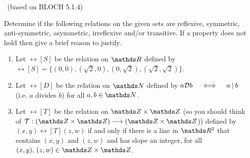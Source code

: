 \documentclass[11pt]{article}
\newcounter{Quesnumb}  %
\newcommand{\problemnum}{%
            \addtocounter{Quesnumb}{1}%
            \arabic{Quesnumb}}
\begin{document}
\begin{problem}{\problemnum \, \textsf{(based on BLOCH 5.1.4)}}
Determine if the following relations on the given sets are reflexive, symmetric, anti-symmetric, asymmetric, irreflexive and/or transitive. If a property does not hold then give a brief reason to justify.
\begin{enumerate}[label=\alph*).]
    \item Let $\rel[S]$ be the relation on $\bbR$ defined by $\rel[S]=\{(0,0), (\sqrt{2}, 0), (0, \sqrt{2}), (\sqrt{2}, \sqrt{2})\}$.
    \item Let $\rel[D]$ be the relation on $\bbN$ defined by $a \rel[D] b \quad \iff \quad a \dv b$ (i.e. $a$ divides $b$) for all $a,b \in \bbN$.
    \item Let $\rel[T]$ be the relation on $\bbZ \times \bbZ$ (so you should think of $\rel[T]: (\bbZ \times \bbZ) \longrightarrow (\bbZ \times \bbZ$)) defined by $(x,y) \rel[T] (z,w)$ if and only if there is a line in $\bbR^2$ that contains $(x,y)$ and $(z,w)$ and has slope an integer, for all $(x,y), \, (z,w) \in \bbZ \times \bbZ$.
\end{enumerate}
\end{problem}
\end{document}
